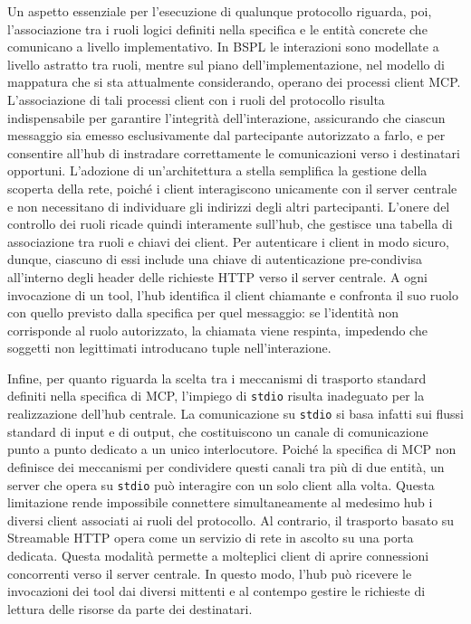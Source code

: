Un aspetto essenziale per l'esecuzione di qualunque protocollo riguarda, poi, l'associazione tra i ruoli logici definiti nella specifica e le entità concrete che comunicano a livello implementativo.
In BSPL le interazioni sono modellate a livello astratto tra ruoli, mentre sul piano dell'implementazione, nel modello di mappatura che si sta attualmente considerando, operano dei processi client MCP. L'associazione di tali processi client con i ruoli del protocollo risulta indispensabile per garantire l'integrità dell'interazione, assicurando che ciascun messaggio sia emesso esclusivamente dal partecipante autorizzato a farlo, e per consentire all'hub di instradare correttamente le comunicazioni verso i destinatari opportuni. L'adozione di un'architettura a stella semplifica la gestione della scoperta della rete, poiché i client interagiscono unicamente con il server centrale e non necessitano di individuare gli indirizzi degli altri partecipanti. L'onere del controllo dei ruoli ricade quindi interamente sull'hub, che gestisce una tabella di associazione tra ruoli e chiavi dei client. Per autenticare i client in modo sicuro, dunque, ciascuno di essi include una chiave di autenticazione pre-condivisa all'interno degli header delle richieste HTTP verso il server centrale. A ogni invocazione di un tool, l'hub identifica il client chiamante e confronta il suo ruolo con quello previsto dalla specifica per quel messaggio: se l'identità non corrisponde al ruolo autorizzato, la chiamata viene respinta, impedendo che soggetti non legittimati introducano tuple nell'interazione.

Infine, per quanto riguarda la scelta tra i meccanismi di trasporto standard definiti nella specifica di MCP, l'impiego di \texttt{stdio} risulta inadeguato per la realizzazione dell'hub centrale.
La comunicazione su \texttt{stdio} si basa infatti sui flussi standard di input e di output, che costituiscono un canale di comunicazione punto a punto dedicato a un unico interlocutore. Poiché la specifica di MCP non definisce dei meccanismi per condividere questi canali tra più di due entità, un server che opera su \texttt{stdio} può interagire con un solo client alla volta. Questa limitazione rende impossibile connettere simultaneamente al medesimo hub i diversi client associati ai ruoli del protocollo. Al contrario, il trasporto basato su Streamable HTTP opera come un servizio di rete in ascolto su una porta dedicata. Questa modalità permette a molteplici client di aprire connessioni concorrenti verso il server centrale. In questo modo, l'hub può ricevere le invocazioni dei tool dai diversi mittenti e al contempo gestire le richieste di lettura delle risorse da parte dei destinatari.

